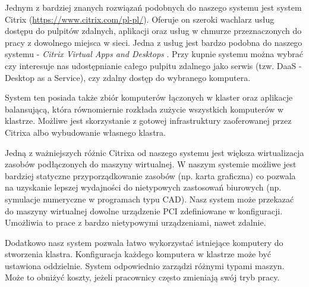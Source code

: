 \documentclass[../wstep.tex]{subfiles}
\begin{document}
Jednym z bardziej znanych rozwiązań podobnych do naszego systemu jest system Citrix (\url{https://www.citrix.com/pl-pl/}).
Oferuje on szeroki wachlarz usług dostępu do pulpitów zdalnych, aplikacji oraz usług w chmurze przeznaczonych do pracy z dowolnego miejsca w sieci.
Jedna z usług jest bardzo podobna do naszego systemu - \textit{Citrix Virtual Apps and Desktops} \parencite{citrix-daas}.
Przy kupnie systemu można wybrać czy interesuje nas udostępnianie całego pulpitu zdalnego jako serwis (tzw. DaaS - Desktop as a Service), czy zdalny dostęp do wybranego komputera.

System ten posiada także zbiór komputerów łączonych w klaster oraz aplikacje balansującą, która równomiernie rozkłada zużycie wszystkich komputerów w klastrze.
Możliwe jest skorzystanie z gotowej infrastruktury zaoferowanej przez Citrixa albo wybudowanie własnego klastra.

Jedną z ważniejszych różnic Citrixa od naszego systemu jest większa wirtualizacja zasobów podłączonych do maszyny wirtualnej.
W naszym systemie możliwe jest bardziej statyczne przyporządkowanie zasobów (np. karta graficzna) co pozwala na uzyskanie lepszej wydajności do nietypowych zastosowań biurowych (np. symulacje numeryczne w programach typu CAD).
Nasz system może przekazać do maszyny wirtualnej dowolne urządzenie PCI zdefiniowane w konfiguracji.
Umożliwia to prace z bardzo nietypowymi urządzeniami, nawet zdalnie.

Dodatkowo nasz system pozwala łatwo wykorzystać istniejące komputery do stworzenia klastra.
Konfiguracja każdego komputera w klastrze może być ustawiona oddzielnie. System odpowiednio zarządzi różnymi typami maszyn.
Może to obniżyć koszty, jeżeli pracownicy często zmieniają swój tryb pracy.
\end{document}
